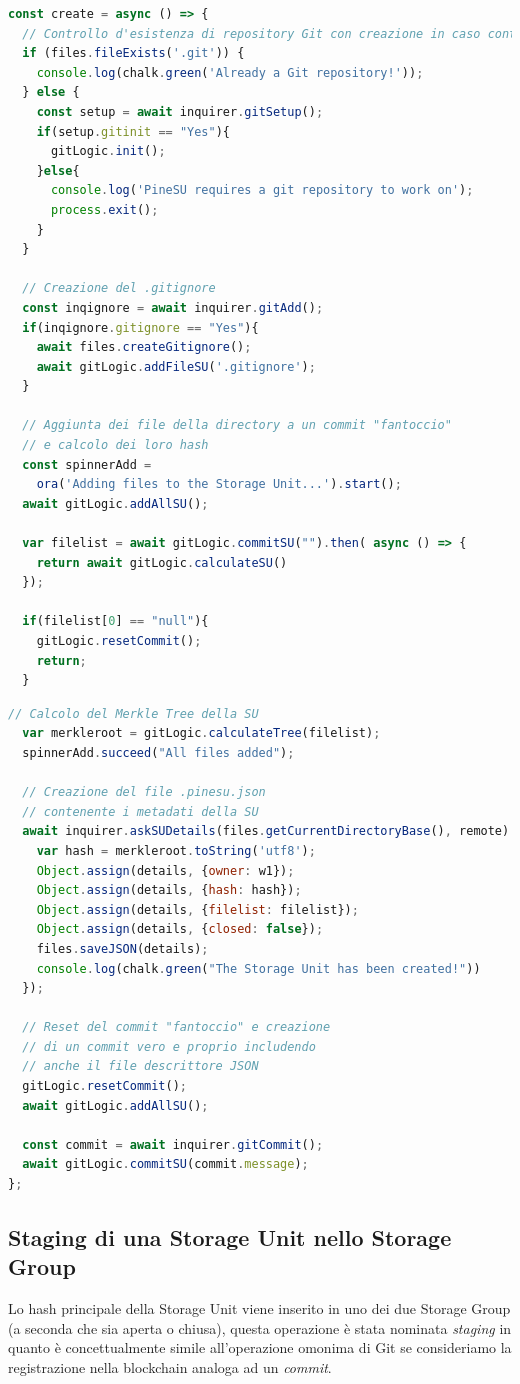 \begin{lstlisting}[language=JavaScript]
const create = async () => {
  // Controllo d'esistenza di repository Git con creazione in caso contrario
  if (files.fileExists('.git')) {
    console.log(chalk.green('Already a Git repository!'));
  } else {
    const setup = await inquirer.gitSetup();
    if(setup.gitinit == "Yes"){
      gitLogic.init();
    }else{
      console.log('PineSU requires a git repository to work on');
      process.exit();
    }
  }

  // Creazione del .gitignore 
  const inqignore = await inquirer.gitAdd();
  if(inqignore.gitignore == "Yes"){
    await files.createGitignore();
    await gitLogic.addFileSU('.gitignore');
  }

  // Aggiunta dei file della directory a un commit "fantoccio"
  // e calcolo dei loro hash
  const spinnerAdd = 
    ora('Adding files to the Storage Unit...').start();
  await gitLogic.addAllSU();

  var filelist = await gitLogic.commitSU("").then( async () => {
    return await gitLogic.calculateSU()
  });
  
  if(filelist[0] == "null"){
    gitLogic.resetCommit();
    return;
  }
\end{lstlisting}
\newpage
\begin{lstlisting}[language=JavaScript, firstnumber=36]
  // Calcolo del Merkle Tree della SU
  var merkleroot = gitLogic.calculateTree(filelist);
  spinnerAdd.succeed("All files added");

  // Creazione del file .pinesu.json
  // contenente i metadati della SU
  await inquirer.askSUDetails(files.getCurrentDirectoryBase(), remote).then((details) => {
    var hash = merkleroot.toString('utf8');
    Object.assign(details, {owner: w1});
    Object.assign(details, {hash: hash});
    Object.assign(details, {filelist: filelist});
    Object.assign(details, {closed: false});
    files.saveJSON(details);
    console.log(chalk.green("The Storage Unit has been created!"))
  });
  
  // Reset del commit "fantoccio" e creazione
  // di un commit vero e proprio includendo
  // anche il file descrittore JSON
  gitLogic.resetCommit();
  await gitLogic.addAllSU();

  const commit = await inquirer.gitCommit();
  await gitLogic.commitSU(commit.message);
};
\end{lstlisting}

\newpage

\subsection{Staging di una Storage Unit nello Storage Group}
\label{sub:stage2}
Lo hash principale della Storage Unit viene inserito in uno dei due Storage Group (a seconda che sia aperta o chiusa), questa operazione è stata nominata \emph{staging} in quanto è concettualmente simile all’operazione omonima di Git se consideriamo la registrazione nella blockchain analoga ad un \emph{commit}.

